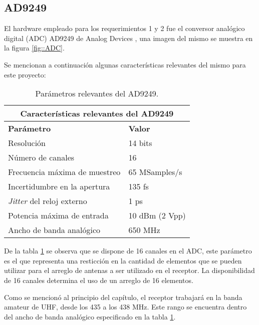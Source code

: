 \documentclass[../../main.tex]{subfiles}
\begin{document}
\subsection{AD9249}
El hardware empleado para los requerimientos 1 y 2 fue el conversor analógico digital (ADC) AD9249 de Analog Devices \cite{AD9249}, una imagen del mismo se muestra en la figura \ref{fig::ADC}.

Se mencionan a continuación algunas características relevantes del mismo para este proyecto:
\begin{table}[H]
    \centering
    \begin{tabular}{|ll|}
    \hline
    \multicolumn{2}{|c|}{\textbf{Características relevantes del AD9249}}                      \\ \hline
    \multicolumn{1}{|l|}{\textbf{Parámetro}}                                          & \textbf{Valor}          \\ \hline
    \multicolumn{1}{|l|}{Resolución}                                         & 14 bits        \\ \hline
    \multicolumn{1}{|l|}{Número de canales}                                  & 16             \\ \hline
    \multicolumn{1}{|l|}{Frecuencia máxima de muestreo}                      & 65 MSamples/s  \\ \hline
    \multicolumn{1}{|l|}{Incertidumbre en la apertura}                       & 135 fs         \\ \hline
    \multicolumn{1}{|l|}{\textit{Jitter} del reloj externo} & 1 ps           \\ \hline
    \multicolumn{1}{|l|}{Potencia máxima de entrada}                         & 10 dBm (2 Vpp) \\ \hline
    \multicolumn{1}{|l|}{Ancho de banda analógico}                           & 650 MHz        \\ \hline
    \end{tabular}
    \caption{Parámetros relevantes del AD9249.}
    \label{tab::ADC}
\end{table}

De la tabla \ref{tab::ADC} se observa que se dispone de 16 canales en el ADC, este parámetro es el que representa una resticción en la cantidad de elementos que se pueden utilizar para el arreglo de antenas a ser utilizado en el receptor. La disponibilidad de 16 canales determina el uso de un arreglo de 16 elementos.

Como se mencionó al principio del capítulo, el receptor trabajará en la banda amateur de UHF, desde los 435 a los 438 MHz. Este rango se encuentra dentro del ancho de banda analógico especificado en la tabla \ref{tab::ADC}.
\end{document}
